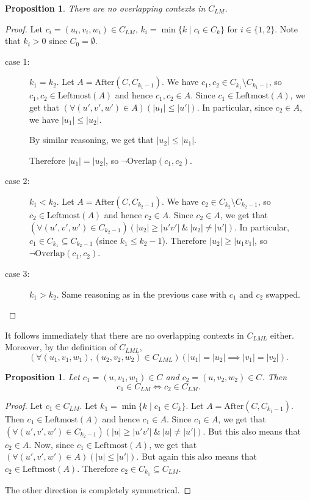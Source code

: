 \documentclass{article}
\newtheorem{proposition}[definition]{Proposition}
\newcommand{\len}[1]{\ensuremath{\left| #1 \right|}}
\begin{document}
	\begin{proposition} \label{prop:ctx_no_overlap}
		There are no overlapping contexts in $C_{LM}$.
	\end{proposition}
	\begin{proof}
		Let $c_i = (u_i, v_i, w_i) \in C_{LM}$, $k_i = \min\{k \mid c_i \in C_k\}$ for $i \in \{1, 2\}$.
		Note that $k_i > 0$ since $C_0 = \emptyset$.
		\begin{description}
			\item[case 1:] $k_1 = k_2$.
				Let $A = \mathrm{After}(C, C_{k_1-1})$. We have $c_1, c_2 \in C_{k_1} \setminus C_{k_1-1}$, so
				$c_1, c_2 \in \mathrm{Leftmost}(A)$ and hence $c_1, c_2 \in A$.
				Since $c_1 \in \mathrm{Leftmost}(A)$, we get that $(\forall (u', v', w') \in A)(\len{u_1} \le \len{u'})$. In particular, since $c_2 \in A$, we have $\len{u_1} \le \len{u_2}$.
				
				By similar reasoning, we get that $\len{u_2} \le \len{u_1}$.
				
				Therefore $\len{u_1} = \len{u_2}$, so $\lnot\mathrm{Overlap}(c_1, c_2)$.
			
			\item[case 2:] $k_1 < k_2$.
				Let $A = \mathrm{After}(C, C_{k_2-1})$. We have $c_2 \in C_{k_2} \setminus C_{k_2-1}$, so $c_2 \in \mathrm{Leftmost}(A)$ and hence $c_2 \in A$.
				Since $c_2 \in A$, we get that \( (\forall (u', v', w') \in C_{k_2-1})(\len{u_2} \ge \len{u'v'}\ \&\ \len{u_2} \ne \len{u'}) \).
				In particular, $c_1 \in C_{k_1} \subseteq C_{k_2-1}$ (since $k_1 \le k_2-1$).
				Therefore $\len{u_2} \ge \len{u_1v_1}$, so $\lnot\mathrm{Overlap}(c_1, c_2)$.
			\item[case 3:] $k_1 > k_2$.
				Same reasoning as in the previous case with $c_1$ and $c_2$ swapped.
		\end{description}
	\end{proof}
	
	It follows immediately that there are no overlapping contexts in $C_{LML}$ either. Moreover, by the definition of $C_{LML}$,
	\[ (\forall (u_1, v_1, w_1), (u_2, v_2, w_2)\in C_{LML})(\len{u_1} = \len{u_2} \implies \len{v_1} = \len{v_2}). \]
	\begin{proposition} \label{prop:ctx_same_u}
		Let $c_1 = (u, v_1, w_1) \in C$ and $c_2 = (u, v_2, w_2) \in C$. Then
		\[ c_1 \in C_{LM} \iff c_2 \in C_{LM}. \]
	\end{proposition}
	\begin{proof}
		Let $c_1\in C_{LM}$. Let $k_1 = \min\{k \mid c_1 \in C_k\}$. Let $A = \mathrm{After}(C, C_{k_1-1})$.
		Then $c_1\in \mathrm{Leftmost}(A)$ and hence $c_1\in A$.
		Since $c_1\in A$, we get that \( (\forall (u', v', w') \in C_{k_2-1})(\len{u} \ge \len{u'v'}\ \&\ \len{u} \ne \len{u'}) \).
		But this also means that $c_2\in A$.
		Now, since $c_1\in \mathrm{Leftmost}(A)$, we get that $(\forall (u', v', w') \in A)(\len{u} \le \len{u'})$.
		But again this also means that $c_2\in \mathrm{Leftmost}(A)$.
		Therefore $c_2\in C_{k_1}\subseteq C_{LM}$.
		
		The other direction is completely symmetrical.
	\end{proof}
\end{document}
